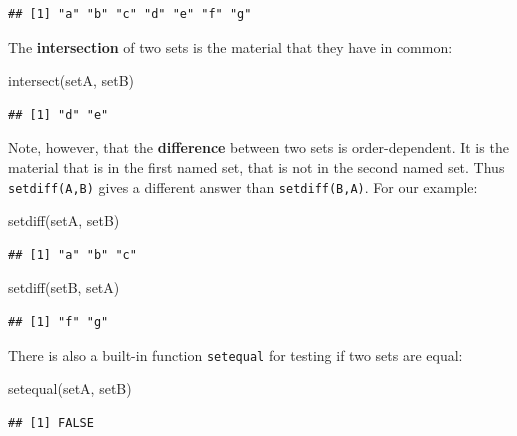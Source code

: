 \documentclass[
]{book}
\newenvironment{Shaded}{\begin{snugshade}}{\end{snugshade}}
\newcommand{\FunctionTok}[1]{\textcolor[rgb]{0.00,0.00,0.00}{#1}}
\newcommand{\NormalTok}[1]{#1}
\begin{document}
\begin{verbatim}
## [1] "a" "b" "c" "d" "e" "f" "g"
\end{verbatim}

The \textbf{intersection} of two sets is the material that they have in common:

\begin{Shaded}
\begin{Highlighting}[]
\FunctionTok{intersect}\NormalTok{(setA, setB)}
\end{Highlighting}
\end{Shaded}

\begin{verbatim}
## [1] "d" "e"
\end{verbatim}

Note, however, that the \textbf{difference} between two sets is order-dependent. It is the material that is in the first named set, that is not in the second named set. Thus \texttt{setdiff(A,B)} gives a different answer than \texttt{setdiff(B,A)}. For our example:

\begin{Shaded}
\begin{Highlighting}[]
\FunctionTok{setdiff}\NormalTok{(setA, setB)}
\end{Highlighting}
\end{Shaded}

\begin{verbatim}
## [1] "a" "b" "c"
\end{verbatim}

\begin{Shaded}
\begin{Highlighting}[]
\FunctionTok{setdiff}\NormalTok{(setB, setA)}
\end{Highlighting}
\end{Shaded}

\begin{verbatim}
## [1] "f" "g"
\end{verbatim}

There is also a built-in function \texttt{setequal} for testing if two sets are equal:

\begin{Shaded}
\begin{Highlighting}[]
\FunctionTok{setequal}\NormalTok{(setA, setB)}
\end{Highlighting}
\end{Shaded}

\begin{verbatim}
## [1] FALSE
\end{verbatim}
\end{document}
